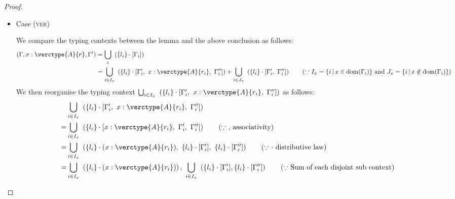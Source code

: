 \begin{proof}
\begin{itemize}
\item Case (\textsc{ver})
\begin{center}
    \begin{minipage}{.60\linewidth}
    \end{minipage}
\end{center}
We compare the typing contexts between the lemma and the above conclusion as follows:
\begin{align*}
(\Gamma, x:\verctype{A}{r}, \Gamma') &= \bigcup_{i} \ \left(\{l_i\}\cdot[\Gamma_i]\right)\\
&= \bigcup_{i\in I_x} \ \left(\{l_i\}\cdot[\Gamma'_i, \ x:\verctype{A}{r_i}, \ \Gamma''_i]\right) + \bigcup_{i\in J_x} \ \left(\{l_i\}\cdot[\Gamma'_i, \ \Gamma''_i]\right)  \tag{$\because$ $I_x=\{i\,|\,x\in\mathrm{dom}(\Gamma_i)\}$ and $J_x=\{i\,|\,x\notin\mathrm{dom}(\Gamma_i)\}$}
\end{align*}
We then reorganise the typing context $\bigcup_{i\in I_x} \ \left(\{l_i\}\cdot[\Gamma'_i, \ x:\verctype{A}{r_i}, \ \Gamma''_i]\right)$ as follows:
\begin{align*}
&\bigcup_{i\in I_x} \ \left(\{l_i\}\cdot[\Gamma'_i, \ x:\verctype{A}{r_i}, \ \Gamma''_i]\right)\\
= &\bigcup_{i\in I_x} \ \left(\{l_i\}\cdot[x:\verctype{A}{r_i}, \ \Gamma'_i, \ \Gamma''_i]\right) \tag{$\because$ $,$ associativity}\\
= &\bigcup_{i\in I_x} \ \left(\{l_i\}\cdot(x:\verctype{A}{r_i}), \ \{l_i\}\cdot[\Gamma'_i], \ \{l_i\}\cdot[\Gamma''_i]\right) \tag{$\because$ $\cdot$ distributive law}\\
= &\bigcup_{i\in I_x} \ \left(\{l_i\}\cdot(x:\verctype{A}{r_i})\right), \ \bigcup_{i\in I_x} \ \left(\{l_i\}\cdot[\Gamma'_i], \{l_i\}\cdot[\Gamma''_i]\right) \tag{$\because$ Sum of each disjoint sub context}\\

\end{align*}
\end{itemize}
\end{proof}
